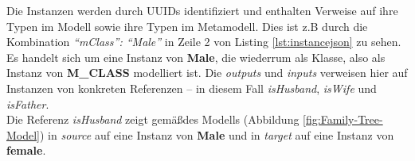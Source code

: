 

Die Instanzen werden durch UUIDs identifiziert und enthalten Verweise auf ihre Typen im Modell sowie ihre Typen im Metamodell. Dies ist z.B durch die Kombination \textit{"`mClass"': "`Male"'} in Zeile 2 von Listing \ref{lst:instancejson} zu sehen. Es handelt sich um eine Instanz von \textbf{Male}, die wiederrum als Klasse, also als Instanz von \textbf{M\_CLASS} modelliert ist. Die \textit{outputs} und \textit{inputs} verweisen hier auf Instanzen von konkreten Referenzen -- in diesem Fall \textit{isHusband}, \textit{isWife} und \textit{isFather}.\\
Die Referenz \textit{isHusband} zeigt gem\"a\ss des Modells (Abbildung \ref{fig:Family-Tree-Model}) in \textit{source} auf eine Instanz von \textbf{Male} und in \textit{target} auf eine Instanz von \textbf{female}.











